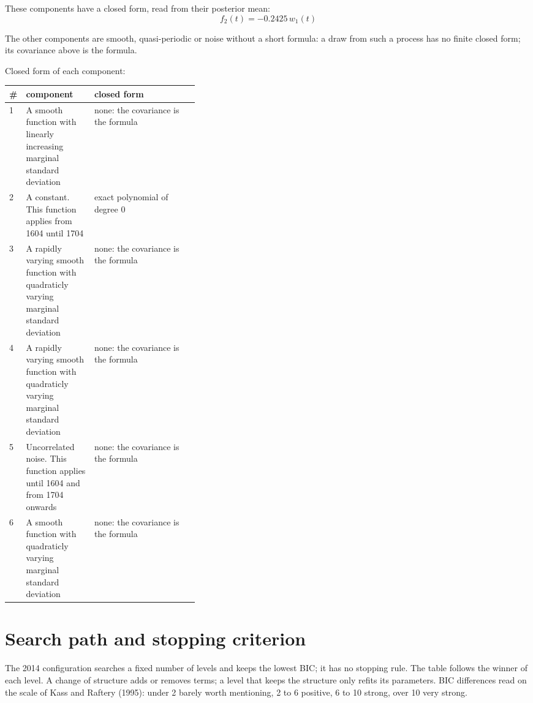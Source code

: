\documentclass[11pt,a4paper]{article}
\begin{document}
These components have a closed form, read from their posterior mean:
\begin{dmath*}
f_{2}(t) = -0.2425\,w_{1}(t)
\end{dmath*}

The other components are smooth, quasi-periodic or noise without a short formula: a draw from such a process has no finite closed form; its covariance above is the formula.

Closed form of each component:

\begin{center}\footnotesize
\begin{tabular}{lp{0.36\linewidth}l}
\toprule
\# & component & closed form \\
\midrule
1 & A smooth function with linearly increasing marginal standard deviation & none: the covariance is the formula \\
2 & A constant. This function applies from 1604 until 1704 & exact polynomial of degree 0 \\
3 & A rapidly varying smooth function with quadraticly varying marginal standard deviation & none: the covariance is the formula \\
4 & A rapidly varying smooth function with quadraticly varying marginal standard deviation & none: the covariance is the formula \\
5 & Uncorrelated noise. This function applies until 1604 and from 1704 onwards & none: the covariance is the formula \\
6 & A smooth function with quadraticly varying marginal standard deviation & none: the covariance is the formula \\
\bottomrule
\end{tabular}
\end{center}

\section*{Search path and stopping criterion}

The 2014 configuration searches a fixed number of levels and keeps the lowest BIC; it has no stopping rule. The table follows the winner of each level. A change of structure adds or removes terms; a level that keeps the structure only refits its parameters. BIC differences read on the scale of Kass and Raftery (1995): under 2 barely worth mentioning, 2 to 6 positive, 6 to 10 strong, over 10 very strong.
\end{document}
